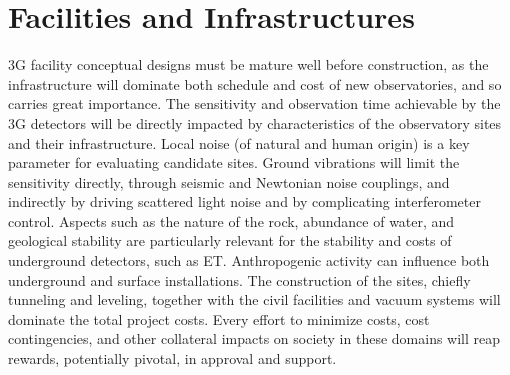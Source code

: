 
\chapter{Facilities and Infrastructures}
\label{sec:Fac_Inf}
\vspace{1cm}
\ac{3G} facility conceptual designs must be mature well before construction, as the infrastructure will dominate both schedule and cost of new observatories, and so carries great importance. 
The sensitivity and observation time achievable by the \ac{3G} detectors will be directly impacted by characteristics of the observatory sites and their infrastructure. 
Local noise (of natural and human origin) is a key parameter for evaluating candidate sites. Ground vibrations will limit the sensitivity directly, through seismic and Newtonian noise couplings, and indirectly by driving scattered light noise and by complicating interferometer control. 
Aspects such as the nature of the rock, abundance of water, and geological stability are particularly relevant for the stability and costs of underground detectors, such as ET. 
Anthropogenic activity can influence both underground and surface installations. The construction of the sites, chiefly tunneling and leveling, together with the civil facilities and vacuum systems will dominate the total project costs. 
Every effort to minimize costs, cost contingencies, and other collateral impacts on society in these domains will reap rewards, potentially pivotal, in approval and support.

% 

